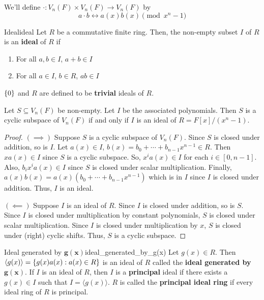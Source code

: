 We'll define $ \cdot : V_n(F)\times V_n(F)\to V_n(F) $
by
\[ a\cdot b \longleftrightarrow a(x)b(x)\pmod{x^n-1} \]

\begin{Definition}{Ideal}{ideal}
    Let $ R $ be a commutative finite ring. Then, the non-empty
    subset $ I $ of $ R $ is an \textbf{ideal} of $ R $ if
    \begin{enumerate}[label=(\arabic*)]
        \item For all $ a,b\in I $, $ a+b\in I $
        \item For all $ a\in I $, $ b\in R $, $ ab\in I $
    \end{enumerate}
    $ \{0\} $ and $ R $ are defined to be \textbf{trivial} ideals of $ R $.
\end{Definition}

\begin{Theorem}{}{}
    Let $ S\subseteq V_n(F) $ be non-empty. Let $ I $ be the associated polynomials.
    Then $ S $ is a cyclic subspace of $ V_n(F) $ if and only if $ I $
    is an ideal of $ R=F[x]/(x^n-1) $.
\end{Theorem}

\begin{proof}
    $ (\implies) $ Suppose $ S $ is a cyclic subspace of $ V_n(F) $.
    Since $ S $ is closed under addition, so is $ I $.
    Let $ a(x)\in I $, $ b(x)=b_0+\cdots+b_{n-1}x^{n-1}\in R $.
    Then $ xa(x)\in I $ since $ S $ is a cyclic subspace. So,
    $ x^i a(x)\in I $ for each $ i\in [0,n-1] $. Also,
    $ b_i x^i a(x)\in I $ since $ S $ is closed under scalar multiplication.
    Finally, $ a(x)b(x)=a(x)(b_0+\cdots+b_{n-1}x^{n-1}) $ which is in $ I $
    since $ I $ is closed under addition. Thus, $ I $ is an ideal.

    $ (\impliedby) $ Suppose $ I $ is an ideal of $ R $. Since $ I $
    is closed under addition, so is $ S $. Since $ I $ is closed
    under multiplication by constant polynomials, $ S $ is closed
    under scalar multiplication. Since $ I $ is closed under
    multiplication by $ x $, $ S $ is closed under (right) cyclic shifts.
    Thus, $ S $ is a cyclic subspace.
\end{proof}

\begin{Definition}{Ideal generated by $\bm{g(x)}$}{ideal_generated_by_g(x)}
    Let $ g(x)\in R $. Then $ \langle g(x) \rangle = \{g(x)a(x):a(x)\in R\} $
    is an ideal of $ R $ called the \textbf{ideal generated by $\bm{g(x)}$}.
    If $ I $ is an ideal of $ R $, then $ I $ is a \textbf{principal}
    ideal if there exists a $ g(x)\in I $ such that $ I= \langle g(x) \rangle $.
    $ R $ is called the \textbf{principal ideal ring} if every ideal
    ring of $ R $ is principal.
\end{Definition}

